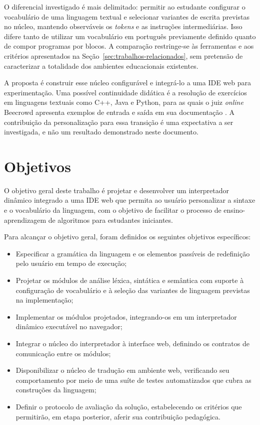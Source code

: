 O diferencial investigado é mais delimitado: permitir ao estudante configurar o vocabulário de uma linguagem textual e selecionar variantes de escrita previstas no núcleo, mantendo observáveis os \textit{tokens} e as instruções intermediárias. Isso difere tanto de utilizar um vocabulário em português previamente definido quanto de compor programas por blocos. A comparação restringe-se às ferramentas e aos critérios apresentados na Seção~\ref{sec:trabalhos-relacionados}, sem pretensão de caracterizar a totalidade dos ambientes educacionais existentes.

A proposta é construir esse núcleo configurável e integrá-lo a uma IDE web para experimentação. Uma possível continuidade didática é a resolução de exercícios em linguagens textuais como C++, Java e Python, para as quais o juiz \textit{online} Beecrowd apresenta exemplos de entrada e saída em sua documentação \cite{beecrowd2026faq}. A contribuição da personalização para essa transição é uma expectativa a ser investigada, e não um resultado demonstrado neste documento.

\section{Objetivos}

O objetivo geral deste trabalho é projetar e desenvolver um interpretador dinâmico integrado a uma IDE web que permita ao usuário personalizar a sintaxe e o vocabulário da linguagem, com o objetivo de facilitar o processo de ensino-aprendizagem de algoritmos para estudantes iniciantes.

Para alcançar o objetivo geral, foram definidos os seguintes objetivos específicos:

\begin{itemize}
    \item Especificar a gramática da linguagem e os elementos passíveis de redefinição pelo usuário em tempo de execução;
    \item Projetar os módulos de análise léxica, sintática e semântica com suporte à configuração de vocabulário e à seleção das variantes de linguagem previstas na implementação;
    \item Implementar os módulos projetados, integrando-os em um interpretador dinâmico executável no navegador;
    \item Integrar o núcleo do interpretador à interface web, definindo os contratos de comunicação entre os módulos;
    \item Disponibilizar o núcleo de tradução em ambiente web, verificando seu comportamento por meio de uma suíte de testes automatizados que cubra as construções da linguagem;
    \item Definir o protocolo de avaliação da solução, estabelecendo os critérios que permitirão, em etapa posterior, aferir sua contribuição pedagógica.
\end{itemize}

